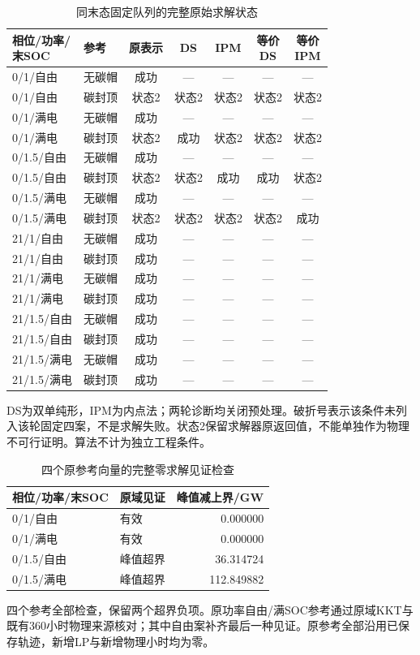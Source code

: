 \begin{table}[H]\centering\caption{同末态固定队列的完整原始求解状态}
\begin{tabular}{llccccc}\toprule
\shortstack{相位/功率/\\末SOC} & 参考 & 原表示 & DS & IPM & \shortstack{等价\\DS} & \shortstack{等价\\IPM}\\\midrule
0/1/自由 & 无碳帽 & 成功 & — & — & — & — \\
0/1/自由 & 碳封顶 & 状态2 & 状态2 & 状态2 & 状态2 & 状态2 \\
0/1/满电 & 无碳帽 & 成功 & — & — & — & — \\
0/1/满电 & 碳封顶 & 状态2 & 成功 & 状态2 & 状态2 & 状态2 \\
0/1.5/自由 & 无碳帽 & 成功 & — & — & — & — \\
0/1.5/自由 & 碳封顶 & 状态2 & 状态2 & 成功 & 成功 & 状态2 \\
0/1.5/满电 & 无碳帽 & 成功 & — & — & — & — \\
0/1.5/满电 & 碳封顶 & 状态2 & 状态2 & 状态2 & 状态2 & 成功 \\
21/1/自由 & 无碳帽 & 成功 & — & — & — & — \\
21/1/自由 & 碳封顶 & 成功 & — & — & — & — \\
21/1/满电 & 无碳帽 & 成功 & — & — & — & — \\
21/1/满电 & 碳封顶 & 成功 & — & — & — & — \\
21/1.5/自由 & 无碳帽 & 成功 & — & — & — & — \\
21/1.5/自由 & 碳封顶 & 成功 & — & — & — & — \\
21/1.5/满电 & 无碳帽 & 成功 & — & — & — & — \\
21/1.5/满电 & 碳封顶 & 成功 & — & — & — & — \\
\bottomrule\end{tabular}
\smallskip\par\noindent DS为双单纯形，IPM为内点法；两轮诊断均关闭预处理。破折号表示该条件未列入该轮固定四案，不是求解失败。状态2保留求解器原返回值，不能单独作为物理不可行证明。算法不计为独立工程条件。
\end{table}
\begin{table}[H]\centering\caption{四个原参考向量的完整零求解见证检查}
\begin{tabular}{llr}\toprule
相位/功率/末SOC & 原域见证 & 峰值减上界/GW\\\midrule
0/1/自由 & 有效 & 0.000000 \\
0/1/满电 & 有效 & 0.000000 \\
0/1.5/自由 & 峰值超界 & 36.314724 \\
0/1.5/满电 & 峰值超界 & 112.849882 \\
\bottomrule\end{tabular}
\smallskip\par\noindent 四个参考全部检查，保留两个超界负项。原功率自由/满SOC参考通过原域KKT与既有360小时物理来源核对；其中自由案补齐最后一种见证。原参考全部沿用已保存轨迹，新增LP与新增物理小时均为零。
\end{table}
